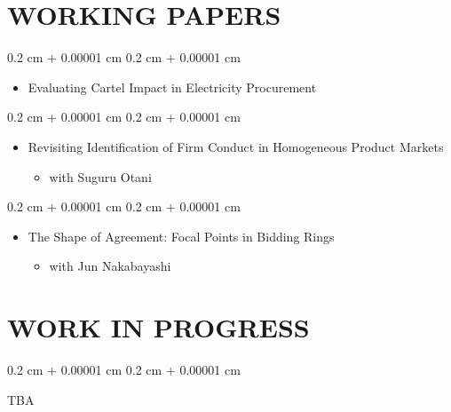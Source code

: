 \documentclass[10pt, letterpaper]{article}
\newenvironment{highlights}{
    \begin{itemize}[
        topsep=0.10 cm,
        parsep=0.10 cm,
        partopsep=0pt,
        itemsep=0.0 cm,
        leftmargin=0.4 cm + 10pt
    ]
}{
    \end{itemize}
} %
\newenvironment{onecolentry}{
    \begin{adjustwidth}{
        0.2 cm + 0.00001 cm
    }{
        0.2 cm + 0.00001 cm
    }
}{
    \end{adjustwidth}
} %
\begin{document}
    \section{WORKING PAPERS}
    \begin{samepage}
        \begin{onecolentry}
            \begin{highlights}
                \item Evaluating Cartel Impact in Electricity Procurement
            \end{highlights}
        \end{onecolentry}
    \end{samepage}
    \vspace{0.10 cm}
    \begin{samepage}
        \begin{onecolentry}
            \begin{highlights}
                \item Revisiting Identification of Firm Conduct in Homogeneous Product Markets
                \begin{highlights}
                    \item with Suguru Otani
                \end{highlights}
            \end{highlights}
        \end{onecolentry}
    \end{samepage}
    \vspace{0.10 cm}
    \begin{samepage}
        \begin{onecolentry}
            \begin{highlights}
                \item The Shape of Agreement: Focal Points in Bidding Rings
                \begin{highlights}
                    \item with Jun Nakabayashi
                \end{highlights}
            \end{highlights}
        \end{onecolentry}
    \end{samepage}

    \section{WORK IN PROGRESS}
    \begin{onecolentry}
        TBA
    \end{onecolentry}
\end{document}
